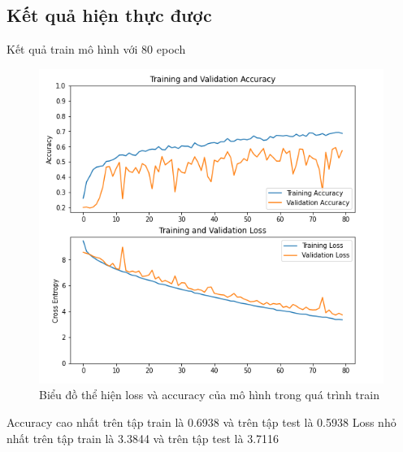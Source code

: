 \subsection{Kết quả  hiện thực được } %
Kết quả train mô hình với 80 epoch
\begin{figure}[H]
    \centering
    \includegraphics[width=\linewidth]{images/Quanh/graph.png}
    \caption{ Biểu đồ thể hiện loss và accuracy của mô hình trong quá trình train}
    \label{fig:graph}
\end{figure}
Accuracy cao nhất trên tập train là 0.6938 và trên tập test là 0.5938
Loss nhỏ nhất trên tập train là 3.3844 và trên tập test là 3.7116

